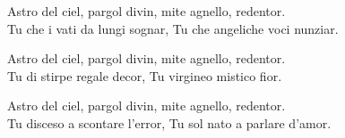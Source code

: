 
\strofa Astro del ciel, pargol divin, mite agnello, redentor.\\
Tu che i vati da lungi sognar, Tu che angeliche voci nunziar.

\spazio

 

\spazio

\strofa Astro del ciel, pargol divin, mite agnello, redentor.\\
Tu di stirpe regale decor, Tu virgineo mistico fior.

\spazio

 

\spazio

\strofa Astro del ciel, pargol divin, mite agnello, redentor.\\
Tu disceso a scontare l'error, Tu sol nato a parlare d'amor.

\spazio

 